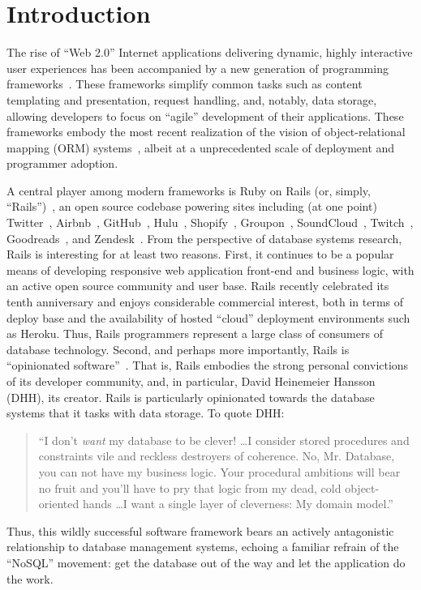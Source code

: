 
\section{Introduction}
\label{sec:intro}

The rise of ``Web 2.0'' Internet applications delivering dynamic, highly
interactive user experiences has been accompanied by a new generation
of programming frameworks~\cite{web20}. These frameworks simplify
common tasks such as content templating and presentation, request
handling, and, notably, data storage, allowing developers to focus on
``agile'' development of their applications. These frameworks embody
the most recent realization of the vision of object-relational mapping
(ORM) systems~\cite{orm-db}, albeit at a unprecedented scale of deployment and
programmer adoption.

A central player among modern frameworks is Ruby on Rails (or, simply,
``Rails'')~\cite{rails-book,rails-computer}, an open source codebase
powering sites including (at one point) Twitter~\cite{twitter-rails},
Airbnb~\cite{airbnb-rails}, GitHub~\cite{github-rails},
Hulu~\cite{hulu-rails}, Shopify~\cite{shopify-rails},
Groupon~\cite{groupon-rails}, SoundCloud~\cite{soundcloud-rails},
Twitch~\cite{twitch-rails}, Goodreads~\cite{goodreads-rails}, and
Zendesk~\cite{zendesk-rails}. From the perspective of database systems
research, Rails is interesting for at least two reasons. First, it
continues to be a popular means of developing responsive web
application front-end and business logic, with an active open source
community and user base. Rails recently celebrated its tenth
anniversary and enjoys considerable commercial interest, both in terms
of deploy base and the availability of hosted ``cloud'' deployment
environments such as Heroku. Thus, Rails programmers represent a large
class of consumers of database technology. Second, and perhaps more
importantly, Rails is ``opinionated
software''~\cite{dhh-opinionated}. That is, Rails embodies the strong
personal convictions of its developer community, and, in particular,
David Heinemeier Hansson (DHH), its creator. Rails is particularly
opinionated towards the database systems that it tasks with data
storage. To quote DHH:
\begin{quote}
``I don't \textit{want} my database to be clever! \dots I consider stored procedures and constraints vile and reckless destroyers of coherence. No, Mr. Database, you can not have my business logic. Your procedural ambitions will bear no fruit and you'll have to pry that logic from my dead, cold object-oriented hands \dots I want a single layer of cleverness: My domain model.''~\cite{dhh-clever}
\end{quote}
Thus, this wildly successful software framework bears an actively
antagonistic relationship to database management systems, echoing a familiar refrain of the ``NoSQL'' movement: get the database out of the way and let the application do the work.


